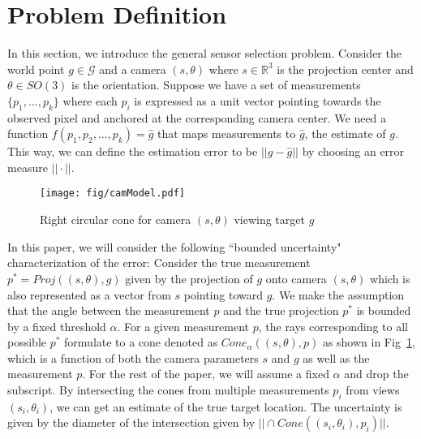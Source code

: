 \section{Problem Definition}
 In this section, we introduce the general sensor selection problem.
Consider the world point $g \in \mathcal{G}$ and a camera $(s, \theta)$ where $s \in \mathbb{R}^3$ is the projection center and $\theta \in SO(3)$ is the  orientation.
Suppose we have a set of measurements $\{p_1, \ldots, p_k\}$ where each $p_i$ is expressed as a unit vector pointing towards the observed pixel and anchored at the corresponding camera center.
We need a function $f(p_1,p_2,...,p_k) = \hat{g}$ that maps measurements to $\hat{g}$, the estimate of $g$. This way, we can define the estimation error to be $||g - \hat{g}||$ by choosing an error measure $||\cdot||$.

 \begin{figure}[h]
 \centering
 	\texttt{[image: fig/camModel.pdf]}
 	\caption{Right circular cone for camera $(s,\theta)$ viewing target $g$}
 	\label{fig:cone}
 \end{figure}

In this paper, we will consider the following ``bounded uncertainty" characterization of the error:
 Consider the true measurement $p^* = Proj((s,\theta),g)$ given by the projection of $g$ onto camera $(s,\theta)$ which is also represented as a vector from $s$ pointing toward $g$. 
We make the assumption that the angle between the measurement $p$ and the true projection $p^*$ is bounded by a fixed threshold $\alpha$.
For a given measurement $p$, the rays corresponding to all  possible $p^*$ formulate to a cone denoted as $Cone_\alpha((s,\theta),p)$ as shown in Fig~\ref{fig:cone}, which is a function of  both the camera parameters $s$ and $g$ as well as  the measurement $p$.
For the rest of the paper, we will assume a fixed $\alpha$ and drop the subscript.
By intersecting the cones from multiple measurements $p_i$ from views $(s_i, \theta_i)$, we can get an estimate of the true target location.
The uncertainty is given by  the diameter of the intersection given by
$||\cap Cone((s_i,\theta_i),p_i)||$.

